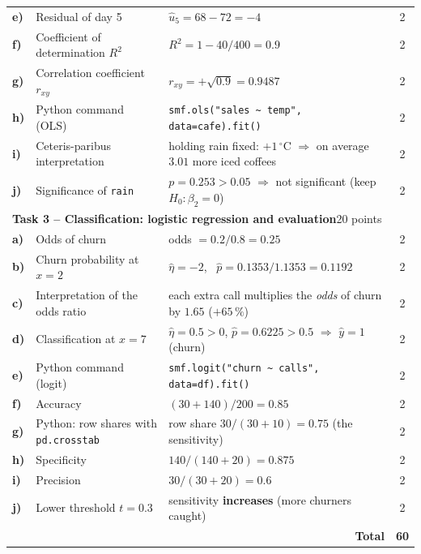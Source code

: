 \documentclass[11pt]{article}
\begin{document}
\begin{footnotesize}
\begin{longtable}{@{}p{0.8cm}>{\raggedright\arraybackslash}p{5.3cm}>{\raggedright\arraybackslash}p{8.4cm}c@{}}
\textbf{e)} & Residual of day 5 & $\hat u_5 = 68 - 72 = -4$ & 2\\
\textbf{f)} & Coefficient of determination $R^2$ & $R^2 = 1 - 40/400 = 0.9$ & 2\\
\textbf{g)} & Correlation coefficient $r_{xy}$ & $r_{xy} = +\sqrt{0.9} = 0.9487$ & 2\\
\textbf{h)} & Python command (OLS) & \texttt{smf.ols("sales \textasciitilde{} temp", data=cafe).fit()} & 2\\
\textbf{i)} & Ceteris-paribus interpretation & holding rain fixed: $+1$\,$^{\circ}$C $\Rightarrow$ on average $3.01$ more iced coffees & 2\\
\textbf{j)} & Significance of \texttt{rain} & $p = 0.253 > 0.05$ $\Rightarrow$ not significant (keep $H_0\colon \beta_2 = 0$) & 2\\
\midrule
\multicolumn{4}{l}{\textbf{Task 3 -- Classification: logistic regression and evaluation}\hfill\textnormal{20 points}}\\
\midrule
\textbf{a)} & Odds of churn & odds $= 0.2/0.8 = 0.25$ & 2\\
\textbf{b)} & Churn probability at $x = 2$ & $\hat\eta = -2$, \ $\hat p = 0.1353/1.1353 = 0.1192$ & 2\\
\textbf{c)} & Interpretation of the odds ratio & each extra call multiplies the \emph{odds} of churn by $1.65$ ($+65\,\%$) & 2\\
\textbf{d)} & Classification at $x = 7$ & $\hat\eta = 0.5 > 0$, $\hat p = 0.6225 > 0.5$ $\Rightarrow$ $\hat y = 1$ (churn) & 2\\
\textbf{e)} & Python command (logit) & \texttt{smf.logit("churn \textasciitilde{} calls", data=df).fit()} & 2\\
\textbf{f)} & Accuracy & $(30 + 140)/200 = 0.85$ & 2\\
\textbf{g)} & Python: row shares with \texttt{pd.crosstab} & row share $30/(30 + 10) = 0.75$ (the sensitivity) & 2\\
\textbf{h)} & Specificity & $140/(140 + 20) = 0.875$ & 2\\
\textbf{i)} & Precision & $30/(30 + 20) = 0.6$ & 2\\
\textbf{j)} & Lower threshold $t = 0.3$ & sensitivity \textbf{increases} (more churners caught) & 2\\
\midrule
\multicolumn{3}{r}{\textbf{Total}} & \textbf{60}\\
\bottomrule
\end{longtable}
\end{footnotesize}
\end{document}
